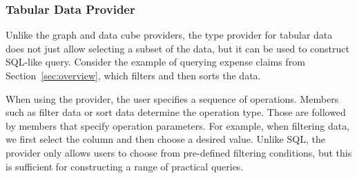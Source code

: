 \documentclass[conference]{IEEEtran}
\newcommand{\ikvd}[1]{{\fontfamily{zi4}\selectfont\small #1}}
\begin{document}
\vspace{0.5em}
\subsubsection*{Tabular Data Provider}

Unlike the graph and data cube providers, the type provider for tabular data does not just
allow selecting a subset of the data, but it can be used to construct SQL-like query. Consider
the example of querying expense claims from Section~\ref{sec:overview}, which filters and then
sorts the data.

When using the provider, the user specifies a sequence of operations. Members such as
\ikvd{\textquotesingle filter data\textquotesingle} or \ikvd{\textquotesingle sort data\textquotesingle}
determine the operation type. Those are followed by members that specify operation parameters.
For example, when filtering data, we first select the column and then choose a desired value.
Unlike SQL, the provider only allows users to choose from pre-defined filtering conditions,
but this is sufficient for constructing a range of practical queries.
\end{document}
